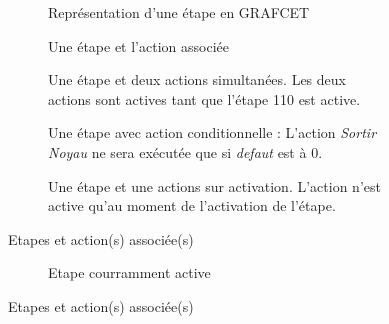 \begin{figure}[ht]
\centering
  \begin{subfigure}[b]{.49\textwidth}
    \centering
    \caption{Représentation d'une étape en GRAFCET}
    \label{fig:etape}
  \end{subfigure}%
  \begin{subfigure}[b]{.49\textwidth}
    \centering
  \caption{Une étape et l'action associée}
  \label{fig:etapeAction}
  \end{subfigure}%

  \begin{subfigure}[b]{.48\textwidth}
    \centering
  \caption{Une étape et deux actions simultanées. Les deux actions sont actives tant que l'étape 110 est active.}
  \label{fig:etapeDeuxActions}
  \end{subfigure}\hfill
%
  \begin{subfigure}[b]{.48\textwidth}
    \centering
  \caption{Une étape avec action conditionnelle : L'action \textit{Sortir Noyau} ne sera exécutée que si \textit{defaut} est à 0.}
  \label{fig:etapeActionCond}
  \end{subfigure}%

  \begin{subfigure}[b]{.48\textwidth}
    \centering
  \caption{Une étape et une actions sur activation. L'action n'est active qu'au moment de l'activation de l'étape.}
  \label{fig:etapeActivation}
  \end{subfigure}
  \caption{Etapes et action(s) associée(s)}
  \begin{subfigure}[b]{.48\textwidth}
    \centering
  \caption{Etape courramment active}
  \label{fig:etapeActive}
  \end{subfigure}
  \caption{Etapes et action(s) associée(s)}
\end{figure}


